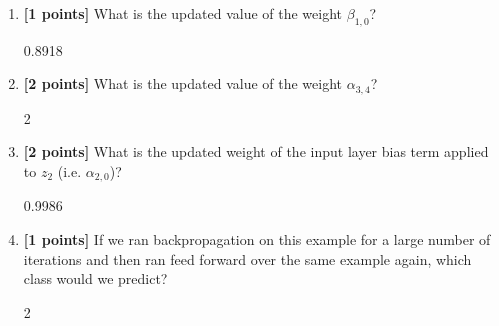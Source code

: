 \documentclass[11pt]{article}
\numberwithin{equation}{section} %
\numberwithin{figure}{section} %
\numberwithin{table}{section} %
\newcommand{\points}[1]{{\bf [#1 points]}}
\begin{document}
\begin{enumerate}
\begin{enumerate}
     
     
        \item \points{1} What is the updated value of the weight $\beta_{1,0}$?
        
        \begin{tcolorbox}[fit,height=1cm, width=2cm, blank, borderline={1pt}{-2pt}]
            \begin{center}\huge0.8918\end{center}
        \end{tcolorbox}
        
        
        \item \points{2} What is the updated value of the weight ${\alpha}_{3,4}$?
        
        \begin{tcolorbox}[fit,height=1cm, width=2cm, blank, borderline={1pt}{-2pt}]
            \begin{center}\huge2\end{center}
        \end{tcolorbox}
        
        
        \item \points{2} What is the updated weight of the input layer bias term applied to $z_2$ (i.e. ${\alpha}_{2,0}$)?
        
        \begin{tcolorbox}[fit,height=1cm, width=2cm, blank, borderline={1pt}{-2pt}]
            \begin{center}\huge0.9986\end{center}
        \end{tcolorbox}
        
        
        \item \points{1} If we ran backpropagation on this example for a large number of iterations and then ran feed forward over the same example again, which class would we predict?
        
        \begin{tcolorbox}[fit,height=1cm, width=2cm, blank, borderline={1pt}{-2pt}]
            \begin{center}\huge2\end{center}
        \end{tcolorbox}
        

    \end{enumerate}


    

 

\end{enumerate}
\end{document}
